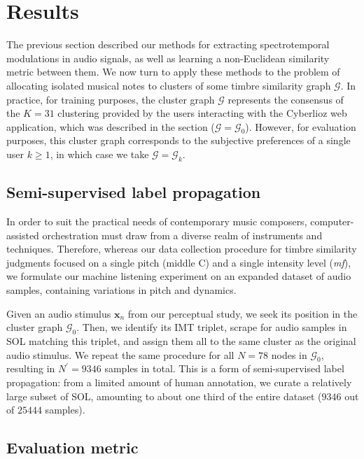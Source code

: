 \documentclass{bmcart}
\newcommand{\vl}[1]{\textcolor{red}{VL: #1}\xspace}
\newcommand{\lnameref}[1]{%
\bgroup
\let\nmu\MakeLowercase
\nameref{#1}\egroup}
\newcommand{\nmu}{}
\begin{document}
\section*{\nmu Results}
\label{sec:results}

The previous section described our methods for extracting spectrotemporal modulations in audio signals, as well as learning a non-Euclidean similarity metric between them.
We now turn to apply these methods to the problem of allocating isolated musical notes to clusters of some timbre similarity graph $\mathcal{G}$.
In practice, for training purposes, the cluster graph $\mathcal{G}$ represents the consensus of the $K=31$ clustering provided by the users interacting with the Cyberlioz web application, which was described in the \lnameref{sec:data-collection} section ($\mathcal{G}=\mathcal{G}_0$).
However, for evaluation purposes, this cluster graph corresponds to the subjective preferences of a single user $k\geq 1$, in which case we take $\mathcal{G}=\mathcal{G}_k$.


\subsection*{Semi-supervised label propagation}

In order to suit the practical needs of contemporary music composers, computer-assisted orchestration must draw from a diverse realm of instruments and techniques.
Therefore, whereas our data collection procedure for timbre similarity judgments focused on a single pitch (middle C) and a single intensity level (\emph{mf}), we formulate our machine listening experiment on an expanded dataset of audio samples, containing variations in pitch and dynamics.

Given an audio stimulus $\boldsymbol{x}_n$ from our perceptual study, we seek its position in the cluster graph $\mathcal{G}_0$.
Then, we identify its IMT triplet, scrape for audio samples in SOL matching this triplet, and assign them all to the same cluster as the original audio stimulus.
We repeat the same procedure for all $N=78$ nodes in $\mathcal{G}_0$, resulting in $N^\prime = 9346$ samples in total.
This is a form of semi-supervised label propagation: from a limited amount of human annotation, we curate a relatively large subset of SOL, amounting to about one third of the entire dataset ($9346$ out of $25444$ samples). %



\subsection*{Evaluation metric}
\end{document}
